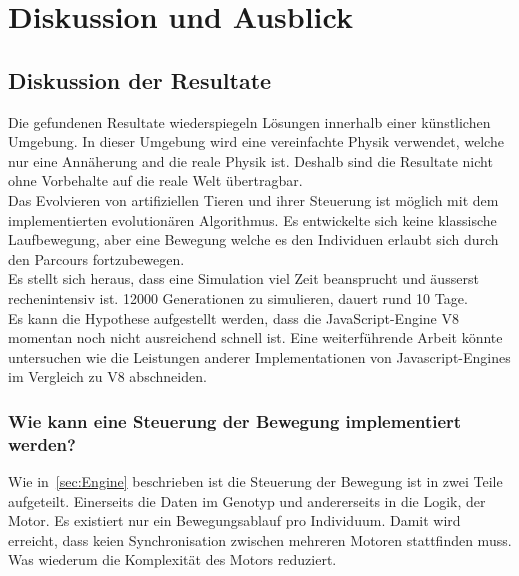 %
%


\chapter{Diskussion und Ausblick\label{chap:perspective}}


  \section{Diskussion der Resultate\label{sec:diskRes}}

    Die gefundenen Resultate wiederspiegeln Lösungen innerhalb einer künstlichen Umgebung.
    In dieser Umgebung wird eine vereinfachte Physik verwendet, welche nur eine Annäherung and die reale Physik ist.
    Deshalb sind die Resultate nicht ohne Vorbehalte auf die reale Welt übertragbar.
    \\
    Das Evolvieren von artifiziellen Tieren und ihrer Steuerung ist möglich
    mit dem implementierten evolutionären Algorithmus.
    Es entwickelte sich keine klassische Laufbewegung,
    aber eine Bewegung welche es den Individuen erlaubt sich durch den Parcours fortzubewegen.
    \\
    Es stellt sich heraus, dass eine Simulation viel Zeit beansprucht und äusserst rechenintensiv ist.
    12000 Generationen zu simulieren, dauert rund 10 Tage.
    \\
    Es kann die Hypothese aufgestellt werden, dass die JavaScript-Engine V8 momentan noch nicht ausreichend schnell ist.
    Eine weiterführende Arbeit könnte untersuchen wie die Leistungen anderer Implementationen von Javascript-Engines im
    Vergleich zu V8 abschneiden.

    \subsection{Wie kann eine Steuerung der Bewegung implementiert werden?}

      Wie in~\vref{sec:Engine} beschrieben ist die Steuerung der Bewegung ist in zwei Teile aufgeteilt.
      Einerseits die Daten im Genotyp und andererseits in die Logik, der Motor.
      Es existiert nur ein Bewegungsablauf pro Individuum.
      Damit wird erreicht, dass keien Synchronisation zwischen mehreren Motoren stattfinden muss.
      Was wiederum die Komplexität des Motors reduziert.

